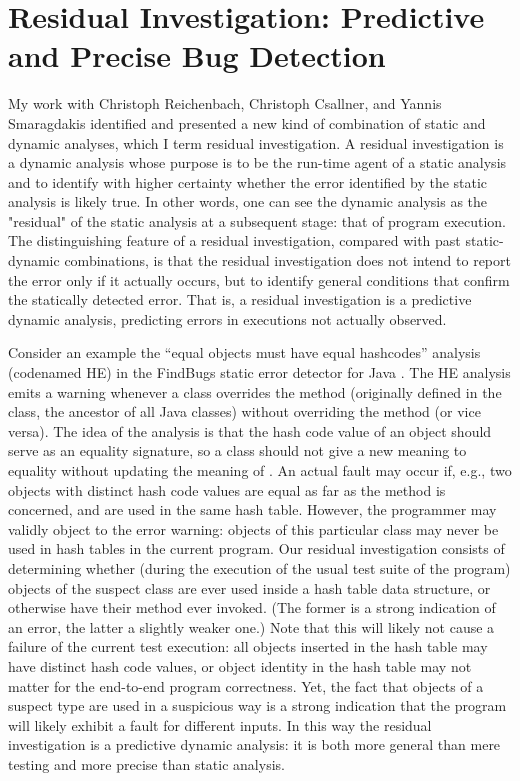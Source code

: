 \documentclass[proposal]{umthesis} %
\begin{document}
\section{Residual Investigation: Predictive and Precise Bug Detection}

My work \cite{rfbi-issta12} with Christoph Reichenbach, Christoph Csallner, and Yannis Smaragdakis identified and presented a new kind of combination of static and dynamic analyses, which I term residual investigation. A residual investigation is a dynamic analysis whose purpose is to be the run-time agent of a static analysis and to identify with higher certainty whether the error identified by the static analysis is likely true.  In other words, one can see the dynamic analysis as the "residual" of the static analysis at a subsequent stage: that of program execution. The distinguishing feature of a residual investigation, compared with past static-dynamic combinations, is that the residual investigation does not intend to report the error only if it actually occurs, but to identify general conditions that confirm the statically detected error. That is, a residual investigation is a predictive dynamic analysis, predicting errors in executions not actually observed.

Consider an example the ``equal objects must have equal hashcodes''
analysis (codenamed HE) in the FindBugs static error detector for Java
\cite{hovemeyer04finding,hovemeyer07finding,Ayewah:2010:GFF:1831708.1831738}. The HE
analysis emits a warning whenever a class overrides the method
 (originally defined in the  class, the
ancestor of all Java classes) without overriding the 
method (or vice versa). The idea of the analysis is that the hash code
value of an object should serve as an equality signature, so a class
should not give a new meaning to equality without updating the meaning
of . An actual fault may occur if, e.g., two objects
with distinct hash code values are equal as far as the 
method is concerned, and are used in the same hash table. 
However, the programmer may validly object to the error
warning: objects of this particular class may never be used
in hash tables in the current program.  Our residual investigation
consists of determining whether (during the execution of the usual
test suite of the program) objects of the suspect class are ever
used inside a hash table data structure, or otherwise have their
 method ever invoked. (The former is a strong indication
of an error, the latter a slightly weaker one.)  Note that this will
likely not cause a failure of the current test execution: all objects
inserted in the hash table may have distinct hash code values, or
object identity in the hash table may not matter for the end-to-end
program correctness. Yet, the fact that objects of a suspect type
are used in a suspicious way is a strong indication that the
program will likely exhibit a fault for different inputs. In this way
the residual investigation is a predictive dynamic analysis: it is
both more general than mere testing and more precise than static analysis.
\end{document}
